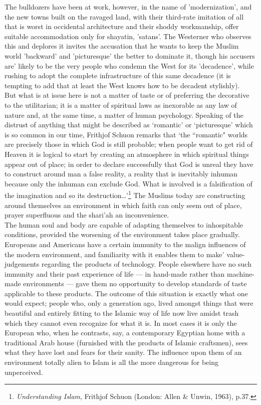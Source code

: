 \documentclass[10pt, twoside,openright]{book}
\begin{document}
The bulldozers have been at work, however, in the name of 'modernization', and the new towns built on 
the ravaged land, with their third\hyp{}rate imitation of all that is worst in occidental architecture and 
their shoddy workmanship, offer suitable accommodation only for shayatin, 'satans'. The Westerner who 
observes this and deplores it invites the accusation that he wants to keep the Muslim world 
'backward' and 'picturesque' the better to dominate it, though his accusers are' likely to be the 
very people who condemn the West for its 'decadence', while rushing to adopt the complete 
infrastructure of this same decadence (it is tempting to add that at least the West knows how to be 
decadent stylishly). \\

But what is at issue here is not a matter of taste or of preferring the decorative to the 
utilitarian; it is a matter of spiritual laws as inexorable as any law of nature and, at the same 
time, a matter of human psychology. Speaking of the distrust of anything that might be described as 
`romantic' or `picturesque' which is so common in our time, Frithjof Schuon remarks that `the 
``romantic" worlds are precisely those in which God is still probable; when people want to get rid of 
Heaven it is logical to start by creating an atmosphere in which spiritual things appear out of 
place; in order to declare successfully that God is unreal they have to construct around man a false 
reality, a reality that is inevitably inhuman because only the inhuman can exclude God. What is 
involved is a falsification of the imagination and so its destruction\ldots{}'\footnote{\emph{Understanding Islam}, Frithjof Schuon (London: Allen \& Unwin, 1963), p.37.} The Muslims today are 
constructing around themselves an environment in which faith can only seem out of place, prayer 
superfluous and the shari'ah an inconvenience. \\

The human soul and body are capable of adapting themselves to inhospitable conditions, provided the 
worsening of the environment takes place gradually. Europeans and Americans have a certain immunity 
to the malign influences of the modern environment, and familiarity with it enables them to make' 
value\hyp{}judgements regarding the products of technology. People elsewhere have no such immunity and 
their past experience of life --- in hand\hyp{}made rather than machine-made environments --- gave them no 
opportunity to develop standards of taste applicable to these products. The outcome of this situation 
is exactly what one would expect; people who, only a generation ago, lived amongst things that were 
beautiful and entirely fitting to the Islamic way of life now live amidst trash which they cannot 
even recognize for what it is. In most cases it is only the European who, when he contrasts, say, a 
contemporary Egyptian home with a traditional Arab house (furnished with the products of Islamic 
craftsmen), sees what they have lost and fears for their sanity. The influence upon them of an 
environment totally alien to Islam is all the more dangerous for being unperceived. \\
\end{document}
